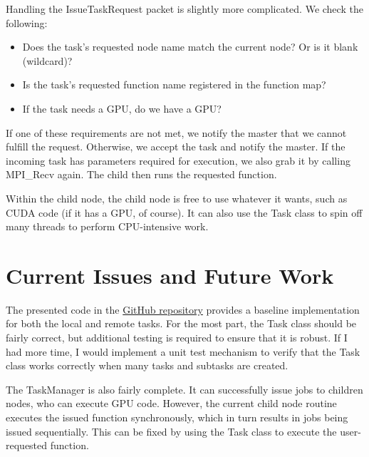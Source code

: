 \documentclass[11pt]{article}
\begin{document}
                Handling the IssueTaskRequest packet is slightly more complicated. We check the following:
                \begin{itemize}
                    \item Does the task's requested node name match the current node? Or is it blank (wildcard)?
                    \item Is the task's requested function name registered in the function map?
                    \item If the task needs a GPU, do we have a GPU?
                \end{itemize}
            
                If one of these requirements are not met, we notify the master that we cannot 
                fulfill the request. Otherwise, we accept the task and notify the master. If the incoming
                task has parameters required for execution, we also grab it by calling MPI\_Recv again. The child
                then runs the requested function.
                
                Within the child node, the child node is free to use whatever it wants, such as CUDA code (if
                it has a GPU, of course). It can also use the Task class to spin off many threads to perform
                CPU-intensive work.

            
    \section{Current Issues and Future Work}
        The presented code in the \href{https://github.com/collielimabean/ME759-F17-FinalProject}{GitHub repository}
        provides a baseline implementation for both the local and remote tasks. For the most part, the Task class
        should be fairly correct, but additional testing is required to ensure that it is robust. If I had more time,
        I would implement a unit test mechanism to verify that the Task class works correctly when many tasks and 
        subtasks are created.
        
        The TaskManager is also fairly complete. It can successfully issue jobs to children nodes, who can execute
        GPU code. However, the current child node routine executes the issued function synchronously, which in turn
        results in jobs being issued sequentially. This can be fixed by using the Task class to execute the user-
        requested function.
        
\end{document}
